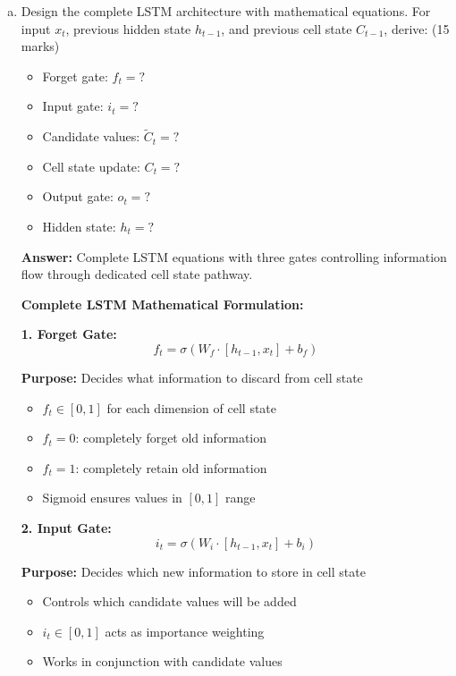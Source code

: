 \documentclass[12pt]{article}
\newcommand{\answer}[1]{{\color{answercolor}\textbf{Answer:} #1}}
\newcommand{\explanation}[1]{{\color{explanationcolor}#1}}
\begin{document}
\begin{enumerate}[(a)]
    \item Design the complete LSTM architecture with mathematical equations. For input $x_t$, previous hidden state $h_{t-1}$, and previous cell state $C_{t-1}$, derive: \hfill (15 marks)
    
    \begin{itemize}
        \item Forget gate: $f_t = ?$
        \item Input gate: $i_t = ?$ 
        \item Candidate values: $\tilde{C}_t = ?$
        \item Cell state update: $C_t = ?$
        \item Output gate: $o_t = ?$
        \item Hidden state: $h_t = ?$
    \end{itemize}
    
    \answer{Complete LSTM equations with three gates controlling information flow through dedicated cell state pathway.}
    
    \explanation{
    \textbf{Complete LSTM Mathematical Formulation:}
    
    \textbf{1. Forget Gate:}
    $$f_t = \sigma(W_f \cdot [h_{t-1}, x_t] + b_f)$$
    
    \textbf{Purpose:} Decides what information to discard from cell state
    \begin{itemize}
        \item $f_t \in [0,1]$ for each dimension of cell state
        \item $f_t = 0$: completely forget old information
        \item $f_t = 1$: completely retain old information
        \item Sigmoid ensures values in $[0,1]$ range
    \end{itemize}
    
    \textbf{2. Input Gate:}
    $$i_t = \sigma(W_i \cdot [h_{t-1}, x_t] + b_i)$$
    
    \textbf{Purpose:} Decides which new information to store in cell state
    \begin{itemize}
        \item Controls which candidate values will be added
        \item $i_t \in [0,1]$ acts as importance weighting
        \item Works in conjunction with candidate values
    \end{itemize}
    
}
\end{enumerate}
\end{document}
